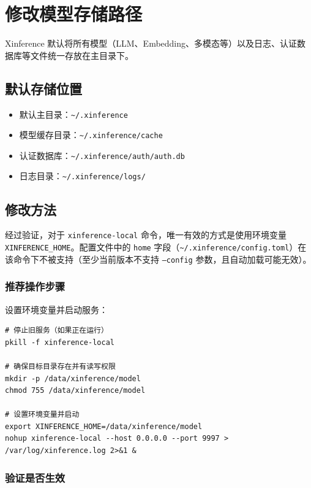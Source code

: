 \documentclass[12pt,UTF8]{ctexbook}
\begin{document}
\section{修改模型存储路径}
\label{sec:model_storage_path}

Xinference 默认将所有模型（LLM、Embedding、多模态等）以及日志、认证数据库等文件统一存放在主目录下。

\subsection{默认存储位置}

\begin{itemize}[leftmargin=2cm]
    \item 默认主目录：\texttt{\textasciitilde/.xinference}
    \item 模型缓存目录：\texttt{\textasciitilde/.xinference/cache}
    \item 认证数据库：\texttt{\textasciitilde/.xinference/auth/auth.db}
    \item 日志目录：\texttt{\textasciitilde/.xinference/logs/}
\end{itemize}

\subsection{修改方法}

经过验证，对于 \texttt{xinference-local} 命令，唯一有效的方式是使用环境变量 \texttt{XINFERENCE\_HOME}。配置文件中的 \texttt{home} 字段（\texttt{\textasciitilde/.xinference/config.toml}）在该命令下不被支持（至少当前版本不支持 \texttt{--config} 参数，且自动加载可能无效）。

\subsubsection{推荐操作步骤}

设置环境变量并启动服务：

\begin{lstlisting}
# 停止旧服务（如果正在运行）
pkill -f xinference-local

# 确保目标目录存在并有读写权限
mkdir -p /data/xinference/model
chmod 755 /data/xinference/model

# 设置环境变量并启动
export XINFERENCE_HOME=/data/xinference/model
nohup xinference-local --host 0.0.0.0 --port 9997 > /var/log/xinference.log 2>&1 &
\end{lstlisting}

\subsubsection{验证是否生效}
\end{document}
